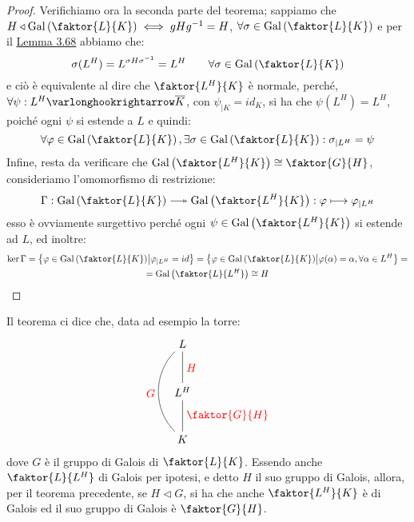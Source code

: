 \documentclass[11pt]{scrartcl}
\begin{document}
\begin{proof}
    Verifichiamo ora la seconda parte del teorema; sappiamo che $H \triangleleft \Gal\left(\faktor{L}{K}\right) \iff gHg^{-1} = H$, $\forall \sigma \in \Gal\left(\faktor{L}{K}\right)$ e per il 
    \hyperref[3.68]{Lemma 3.68} abbiamo che:
    \[ \sigma(L^H) = L^{\sigma H \sigma^{-1}} = L^H \qquad \forall \sigma \in \Gal\left(\faktor{L}{K}\right)
        \]
    e ciò è equivalente al dire che $\faktor{L^H}{K}$ è normale, perché, $\forall \psi : L^H \varlonghookrightarrow \ol K$, con $\psi_{|K} = id_K$, si ha che $\psi(L^H) = L^H$, poiché ogni $\psi$ si estende a $L$ e quindi:
    \[ \forall \varphi \in \Gal\left(\faktor{L}{K}\right), \exists \sigma \in \Gal\left(\faktor{L}{K}\right) : \sigma_{|L^H} = \psi
        \]
    Infine, resta da verificare che $\Gal\left(\faktor{L^H}{K}\right) \cong \faktor{G}{H}$, consideriamo l'omomorfismo di restrizione:
    \[ \Gamma : \Gal\left(\faktor{L}{K}\right) \twoheadlongrightarrow \Gal\left(\faktor{L^H}{K}\right) : \varphi \longmapsto \varphi_{|L^H}
        \]
    esso è ovviamente surgettivo perché ogni $\psi \in \Gal\left(\faktor{L^H}{K}\right)$ si estende ad $L$, ed inoltre:
    \begin{multline*}
        \ker \Gamma = \left\{\varphi \in \Gal\left(\faktor{L}{K}\right) \m \varphi_{|L^H} = id \right\} = \left\{\varphi \in \Gal\left(\faktor{L}{K}\right) \m \varphi(\alpha) = \alpha, \forall \alpha \in L^H\right\} = \\ 
        = \Gal\left(\faktor{L}{L^H}\right) \cong H
    \end{multline*}
\end{proof}

\begin{remark}
    Il teorema ci dice che, data ad esempio la torre:
    \[\begin{tikzpicture}
        \node (Q1) at (0,-1.5) {$K$};
        \node (Q3) at (0,0) {$L^H$};
        \node (Q4) at (0,1.5) {$L$};
        \draw (Q4)--(Q3) node [right, yshift=-0.75cm, red] {$\faktor{G}{H}$};
        \draw (Q1)--(Q3) node [right, yshift=0.75cm, red] {$H$};
        \draw(Q4) to [bend right=45] (Q1) node[left, yshift=1.20cm, xshift=-0.5cm, red] {$G$};
    \end{tikzpicture}
        \]
    dove $G$ è il gruppo di Galois di $\faktor{L}{K}$. Essendo anche $\faktor{L}{L^H}$ di Galois 
    per ipotesi, e detto $H$ il suo gruppo di Galois, allora, per il teorema precedente, se $H \triangleleft G$,
    si ha che anche $\faktor{L^H}{K}$ è di Galois ed il suo gruppo di Galois è $\faktor{G}{H}$.
\end{remark}
\end{document}
